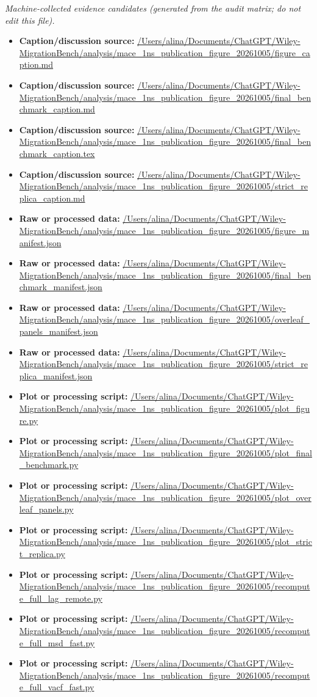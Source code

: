 \emph{Machine-collected evidence candidates (generated from the audit matrix; do not edit this file).}
\begin{itemize}[leftmargin=1.4em,noitemsep]
\item \textbf{Caption/discussion source:} \url{/Users/alina/Documents/ChatGPT/Wiley-MigrationBench/analysis/mace_1ns_publication_figure_20261005/figure_caption.md}
\item \textbf{Caption/discussion source:} \url{/Users/alina/Documents/ChatGPT/Wiley-MigrationBench/analysis/mace_1ns_publication_figure_20261005/final_benchmark_caption.md}
\item \textbf{Caption/discussion source:} \url{/Users/alina/Documents/ChatGPT/Wiley-MigrationBench/analysis/mace_1ns_publication_figure_20261005/final_benchmark_caption.tex}
\item \textbf{Caption/discussion source:} \url{/Users/alina/Documents/ChatGPT/Wiley-MigrationBench/analysis/mace_1ns_publication_figure_20261005/strict_replica_caption.md}
\item \textbf{Raw or processed data:} \url{/Users/alina/Documents/ChatGPT/Wiley-MigrationBench/analysis/mace_1ns_publication_figure_20261005/figure_manifest.json}
\item \textbf{Raw or processed data:} \url{/Users/alina/Documents/ChatGPT/Wiley-MigrationBench/analysis/mace_1ns_publication_figure_20261005/final_benchmark_manifest.json}
\item \textbf{Raw or processed data:} \url{/Users/alina/Documents/ChatGPT/Wiley-MigrationBench/analysis/mace_1ns_publication_figure_20261005/overleaf_panels_manifest.json}
\item \textbf{Raw or processed data:} \url{/Users/alina/Documents/ChatGPT/Wiley-MigrationBench/analysis/mace_1ns_publication_figure_20261005/strict_replica_manifest.json}
\item \textbf{Plot or processing script:} \url{/Users/alina/Documents/ChatGPT/Wiley-MigrationBench/analysis/mace_1ns_publication_figure_20261005/plot_figure.py}
\item \textbf{Plot or processing script:} \url{/Users/alina/Documents/ChatGPT/Wiley-MigrationBench/analysis/mace_1ns_publication_figure_20261005/plot_final_benchmark.py}
\item \textbf{Plot or processing script:} \url{/Users/alina/Documents/ChatGPT/Wiley-MigrationBench/analysis/mace_1ns_publication_figure_20261005/plot_overleaf_panels.py}
\item \textbf{Plot or processing script:} \url{/Users/alina/Documents/ChatGPT/Wiley-MigrationBench/analysis/mace_1ns_publication_figure_20261005/plot_strict_replica.py}
\item \textbf{Plot or processing script:} \url{/Users/alina/Documents/ChatGPT/Wiley-MigrationBench/analysis/mace_1ns_publication_figure_20261005/recompute_full_lag_remote.py}
\item \textbf{Plot or processing script:} \url{/Users/alina/Documents/ChatGPT/Wiley-MigrationBench/analysis/mace_1ns_publication_figure_20261005/recompute_full_msd_fast.py}
\item \textbf{Plot or processing script:} \url{/Users/alina/Documents/ChatGPT/Wiley-MigrationBench/analysis/mace_1ns_publication_figure_20261005/recompute_full_vacf_fast.py}
\end{itemize}
